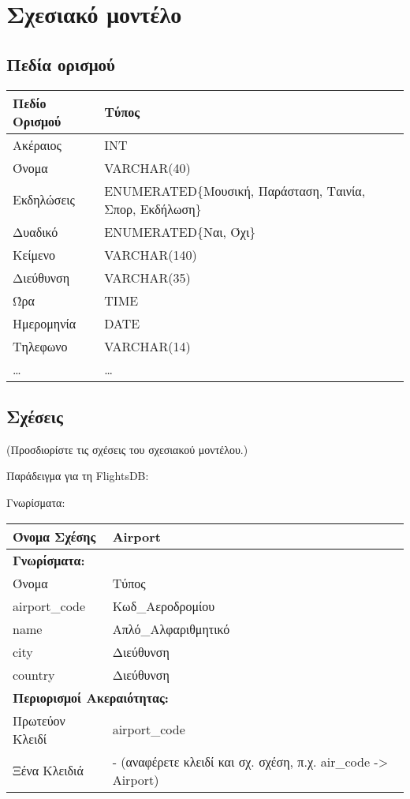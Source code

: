 
\section{Σχεσιακό μοντέλο}

\subsection{Πεδία ορισμού}


\begin{tabular}{|p{6cm}|p{6cm}|}
\hline
  Πεδίο Ορισμού & Τύπος \\ \hline
  Ακέραιος & INT \\ \hline
  Όνομα & VARCHAR(40) \\ \hline
  Εκδηλώσεις & ENUMERATED\{Μουσική, Παράσταση, Ταινία, Σπορ,
               Εκδήλωση\} \\ \hline
  Δυαδικό & ENUMERATED\{Ναι, Όχι\} \\ \hline
  Κείμενο & VARCHAR(140) \\ \hline
  Διεύθυνση & VARCHAR(35) \\ \hline
  Ώρα & TIME \\ \hline
  Ημερομηνία & DATE \\ \hline
  Τηλεφωνο & VARCHAR(14) \\ \hline
  
… & … \\ \hline
\end{tabular}

\subsection{Σχέσεις}

(Προσδιορίστε τις σχέσεις του σχεσιακού μοντέλου.)

Παράδειγμα για τη FlightsDB:

Γνωρίσματα:

\begin{tabular}{|p{6cm}|p{6cm}|}
  \hline
  Όνομα Σχέσης & Airport \\ \hline
  \multicolumn{2}{|l|}{\textbf{Γνωρίσματα:}} \\ \hline
  Όνομα & Τύπος \\ \hline
  airport\_code & Κωδ\_Αεροδρομίου \\ \hline
  name & Απλό\_Αλφαριθμητικό \\ \hline
  city & Διεύθυνση \\ \hline
  country & Διεύθυνση \\ \hline
  \multicolumn{2}{|l|}{\textbf{Περιορισμοί Ακεραιότητας:}} \\ \hline
  Πρωτεύον Κλειδί & airport\_code \\ \hline
  Ξένα Κλειδιά & - (αναφέρετε κλειδί και σχ. σχέση, π.χ. air\_code ->
                 Airport) \\ \hline
\end{tabular}

